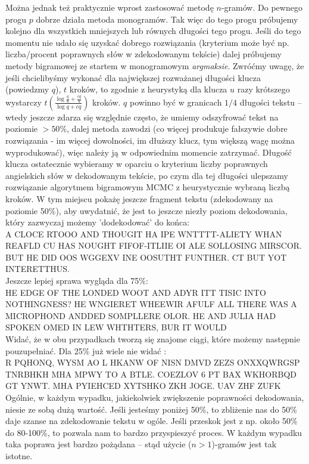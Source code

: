 \documentclass[a4paper]{article}
\theoremstyle{defn}
\theoremstyle{theorem}
\theoremstyle{lemma}
\theoremstyle{cor}
\theoremstyle{fact}
\begin{document}
Można jednak też praktycznie wprost zastosować metodę $n$-gramów. Do pewnego progu $p$ dobrze działa metoda monogramów. Tak więc do tego progu próbujemy kolejno dla wszystkich mniejszych lub równych długości tego progu. Jeśli do tego momentu nie udało się uzyskać dobrego rozwiązania (kryterium może być np. liczba/procent poprawnych słów w zdekodowanym tekście) dalej próbujemy metody bigramowej ze startem w monogramowym \textit{argmaksie}. Zwróćmy uwagę, że jeśli chcielibyśmy wykonać dla największej rozważanej długości klucza (powiedzmy $q$),  $t$ kroków, to zgodnie z heurystyką dla klucza $u$ razy krótszego wystarczy $ t(\frac{\log \frac{q}{u} + \frac{cq}{u}}{\log q + cq})$ kroków. $q$ powinno być w granicach $1/4$ długości tekstu – wtedy jeszcze zdarza się względnie często, że umiemy odszyfrować tekst na poziomie $>50\%$, dalej metoda zawodzi (co więcej produkuje fałszywie dobre rozwiązania - im więcej dowolności, im dłuższy klucz, tym większą wagę można wyprodukować), więc należy ją w odpowiednim momencie zatrzymać. Długość klucza ostatecznie wybieramy w oparciu o kryterium liczby poprawnych angielskich słów w dekodowanym tekście, po czym dla tej długości ulepszamy rozwiązanie algorytmem bigramowym MCMC z heurystycznie wybraną liczbą kroków. W tym miejscu pokażę jeszcze fragment tekstu (zdekodowany na poziomie 50\%), aby uwydatnić, że jest to jeszcze niezły poziom dekodowania, który zazwyczaj możemy 'dodekodować' do końca:\\
A CLOCE RTOOO AND THOUGIT HA IPE WNTTTT-ALIETY WHAN REAFLD CU HAS NOUGHT FIFOF-ITLIIE OI ALE SOLLOSING MIRSCOR. BUT HE DID OOS WGGEXV INE OOSUTHT FUNTHER. CT BUT YOT INTERETTHUS.
\\
Jeszcze lepiej sprawa wygląda dla 75\%:\\
HE EDGE OF THE LONDED WOOT AND ADYR ITT TISIC INTO NOTHINGNESS? HE WNGIERET WHEEWIR AFULF ALL THERE WAS A MICROPHOND ANDDED SOMPLLERE OLOR. HE AND JULIA HAD SPOKEN OMED IN LEW WHTHTERS, BUR IT WOULD
\\
Widać, że w obu przypadkach tworzą się znajome ciągi, które możemy następnie pouzupełniać. Dla 25\% już wiele nie widać :\\
R PQHONQ, WYSM AO L HKANW OF NISN DMVD ZEZS ONXXQWRGSP TNRBHKH MHA MPWY TO A BTLE. COEZLOV 6 PT BAX WKHORBQD GT YNWT. MHA PYIEHCED XYTSHKO ZKH JOGE. UAV ZHF ZUFK\\
Ogólnie, w każdym wypadku, jakiekolwiek zwiększenie poprawności dekodowania, niesie ze sobą dużą wartość. Jeśli jesteśmy poniżej 50\%, to zbliżenie nas do 50\% daje szanse na zdekodowanie tekstu w ogóle. Jeśli przeskok jest z np. około 50\% do 80-100\%, to pozwala nam to bardzo przyspieszyć proces. W każdym wypadku taka poprawa jest bardzo pożądana – stąd użycie ($n>1$)-gramów jest tak istotne.\\\\
\end{document}
